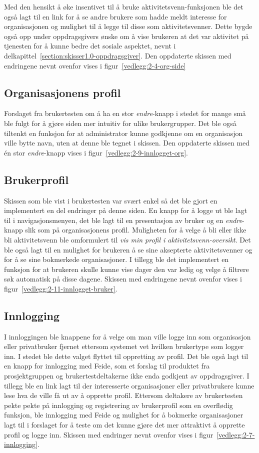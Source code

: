 Med den hensikt å øke insentivet til å bruke aktivitetsvenn-funksjonen ble det også lagt til en link for å se andre brukere som hadde meldt interesse for organisasjonen og mulighet til å legge til disse som aktivitetsvenner. Dette bygde også opp under oppdragsgivers ønske om å vise brukeren at det var aktivitet på tjenesten for å kunne bedre det sosiale aspektet, nevnt i delkapittel~\ref{section:skisser1.0-oppdragsgiver}. Den oppdaterte skissen med endringene nevnt ovenfor vises i figur~\ref{vedlegg:2-4-org-side}

\subsection{Organisasjonens profil}

Forslaget fra brukertesten om å ha en stor {\em endre}-knapp i stedet for mange små ble fulgt for å gjøre siden mer intuitiv for ulike brukergrupper. Det ble også tiltenkt en funksjon for at administrator kunne godkjenne om en organisasjon ville bytte navn, uten at denne ble tegnet i skissen. Den oppdaterte skissen med én stor {\em endre}-knapp vises i figur~\ref{vedlegg:2-9-innlogget-org}.

\subsection{Brukerprofil}
 
Skissen som ble vist i brukertesten var svært enkel så det ble gjort en implementert en del endringer på denne siden. En knapp for å logge ut ble lagt til i navigasjonsmenyen, det ble lagt til en presentasjon av bruker og en {\em endre}-knapp slik som på organisasjonens profil. Muligheten for å velge å bli eller ikke bli aktivitetsvenn ble omformulert til {\em vis min profil i aktivitetsvenn-oversikt}. Det ble også lagt til en mulighet for brukeren å se sine aksepterte aktivitetsvenner og for å se sine bokmerkede organisasjoner. I tillegg ble det implementert en funksjon for at brukeren skulle kunne vise dager den var ledig og velge å filtrere søk automatisk på disse dagene. Skissen med endringene nevnt ovenfor vises i figur~\ref{vedlegg:2-11-innlogget-bruker}.

\subsection{Innlogging}
 I innloggingen ble knappene for å velge om man ville logge inn som organisasjon eller privatbruker fjernet ettersom systemet vet hvilken brukertype som logger inn. I stedet ble dette valget flyttet til oppretting av profil. Det ble også lagt til en knapp for innlogging med Feide, som et forslag til produktet fra prosjektgruppen og brukertestdeltakerne ikke enda godkjent av oppdragsgiver. I tillegg ble en link lagt til der interesserte organisasjoner eller privatbrukere kunne lese hva de ville få ut av å opprette profil. Ettersom deltakere av brukertesten pekte pekte på innlogging og registrering av brukerprofil som en overflødig funksjon, ble innlogging med Feide og mulighet for å bokmerke organisasjoner lagt til i forslaget for å teste om det kunne gjøre det mer attraktivt å opprette profil og logge inn. Skissen med endringer nevnt ovenfor vises i figur~\ref{vedlegg:2-7-innlogging}.

